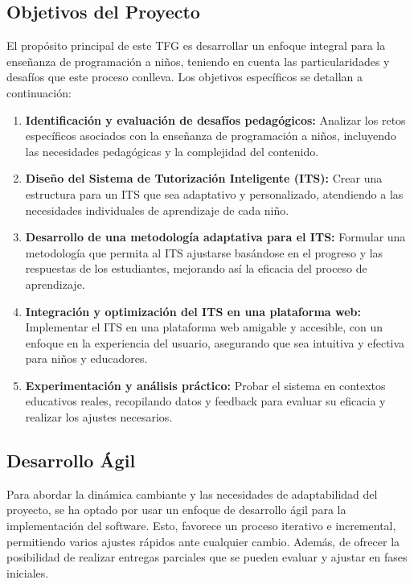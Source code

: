 \subsection{Objetivos del Proyecto}

El propósito principal de este TFG es desarrollar un enfoque integral para la enseñanza de programación a niños, teniendo en cuenta las particularidades y desafíos que este proceso conlleva. Los objetivos específicos se detallan a continuación:

\begin{enumerate}  
    \item \textbf{Identificación y evaluación de desafíos pedagógicos:} Analizar los retos específicos asociados con la enseñanza de programación a niños, incluyendo las necesidades pedagógicas y la complejidad del contenido.
    
    \item \textbf{Diseño del Sistema de Tutorización Inteligente (ITS):} Crear una estructura para un ITS que sea adaptativo y personalizado, atendiendo a las necesidades individuales de aprendizaje de cada niño.
    
    \item \textbf{Desarrollo de una metodología adaptativa para el ITS:} Formular una metodología que permita al ITS ajustarse basándose en el progreso y las respuestas de los estudiantes, mejorando así la eficacia del proceso de aprendizaje.
    
    \item \textbf{Integración y optimización del ITS en una plataforma web:} Implementar el ITS en una plataforma web amigable y accesible, con un enfoque en la experiencia del usuario, asegurando que sea intuitiva y efectiva para niños y educadores.
    
    \item \textbf{Experimentación y análisis práctico:} Probar el sistema en contextos educativos reales, recopilando datos y feedback para evaluar su eficacia y realizar los ajustes necesarios.
    
\end{enumerate}

\subsection{Desarrollo Ágil}
Para abordar la dinámica cambiante y las necesidades de adaptabilidad del proyecto, se ha optado por usar un enfoque de desarrollo ágil para la implementación del software. Esto, favorece un proceso iterativo e incremental, permitiendo varios ajustes rápidos ante cualquier cambio. Además, de ofrecer la posibilidad de realizar entregas parciales que se pueden evaluar y ajustar en fases iniciales.


